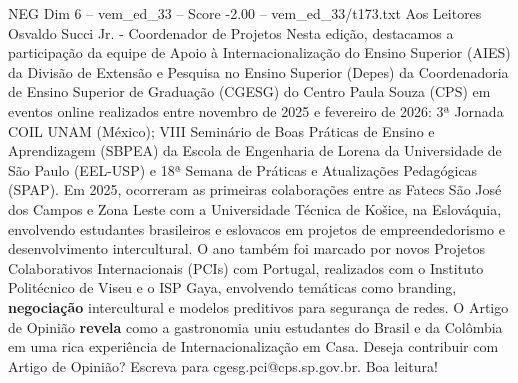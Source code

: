 \begin{textsample}{NEG Dim 6 – vem\_ed\_33 – Score -2.00 – vem\_ed\_33/t173.txt}  \label{ex:f6_neg_091}
Aos Leitores Osvaldo Succi Jr. - Coordenador de Projetos Nesta edição, destacamos a participação da equipe de Apoio à Internacionalização do Ensino Superior (AIES) da Divisão de Extensão e Pesquisa no Ensino Superior (Depes) da Coordenadoria de Ensino Superior de Graduação (CGESG) do Centro Paula Souza (CPS) em eventos online realizados entre novembro de 2025 e fevereiro de 2026: 3ª Jornada COIL UNAM (México); VIII Seminário de Boas Práticas de Ensino e Aprendizagem (SBPEA) da Escola de Engenharia de Lorena da Universidade de São Paulo (EEL-USP) e 18ª Semana de Práticas e Atualizações Pedagógicas (SPAP).
Em 2025, ocorreram as primeiras colaborações entre as Fatecs São José dos Campos e Zona Leste com a Universidade Técnica de Košice, na Eslováquia, envolvendo estudantes brasileiros e eslovacos em projetos de empreendedorismo e desenvolvimento intercultural.
O ano também foi marcado por novos Projetos Colaborativos Internacionais (PCIs) com Portugal, realizados com o Instituto Politécnico de Viseu e o ISP Gaya, envolvendo temáticas como branding, \textbf{negociação} intercultural e modelos preditivos para segurança de redes.
O Artigo de Opinião \textbf{revela} como a gastronomia uniu estudantes do Brasil e da Colômbia em uma rica experiência de Internacionalização em Casa.
Deseja contribuir com Artigo de Opinião?
Escreva para cgesg.pci@cps.sp.gov.br.
Boa leitura!

\end{textsample}

